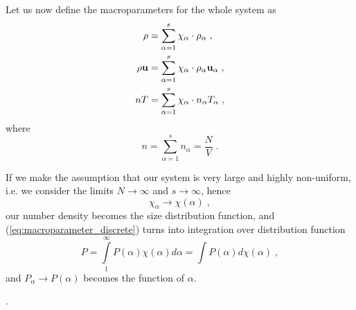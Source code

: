 \documentclass[preprint, aps, pra]{revtex4-1}
\newcommand{\bu}{{\bf{u}}}
\begin{document}
Let us now define the macroparameters for the whole system as
\begin{equation}
  \begin{split}
    \rho &= \sum_{\alpha=1}^{s}\chi_\alpha\cdot\rho_\alpha\;,\\
    \rho\bu &= \sum_{\alpha=1}^{s}\chi_\alpha\cdot\rho_\alpha\bu_\alpha\;,\\
    nT &= \sum_{\alpha=1}^{s}\chi_\alpha\cdot n_\alpha T_\alpha\;,
  \end{split}
\end{equation}
where
\begin{equation}
  n = \sum_{\alpha=1}^{s} n_\alpha = \frac{N}{V}\;.
\end{equation}

If we make the assumption that our system is very large and 
highly non-uniform, i.e. we consider the limits $N\to\infty$ and $s\to\infty$, hence 
\begin{equation}
  \chi_\alpha\rightarrow\chi(\alpha)\;,
\end{equation}
our number density becomes the size distribution function, and (\ref{eq:macroparameter_discrete}) turns into integration over
distribution function
\begin{equation}
  P = \int\limits_1^\infty P(\alpha)\chi(\alpha)d\alpha=\int P(\alpha)d\chi(\alpha)\;,
\end{equation}
and $P_\alpha\rightarrow P(\alpha)$ becomes the function of $\alpha$.


  \cite{Brilliantov:2004book, Bodrova:2014epl_steep_distr, Brilliantov:2007pre_coll_dyn, 
  Brilliantov:2007pre_coll_adh, Schwager:2007gm_coll_dyn, Dilley:1993icarus_energy_loss, 
  Garzo:2012pre_maxwell_gas, DeSoria:2013pre_hydro_gas, Schaefer:1996jphys_force_schemes, 
  Garzo:2007pre_enskog_I, Garzo:2007pre_enskog_II, Garzo:1999pre_gran_mixture, 
  Geminard:2004pre_gran_pressure, Quinn:2010astro_hill_simplectic, Barrat:2002gm_binary_mix, 
  Hoffmann:2013astrolett_vertical_relax, Cuendet:2007jchem_md_simul, Uecker:2009pre_part_energy, 
  Morishima:2006icarus_dense_ring_simul, Ohtsuki:1998icarus_vel_disp, Salo:2010icarus_N_body, 
  Greenberg:1988icarus, Spahn:2006gamm_hydro_rings, Lois:2007pre_shear_flow, 
  Spahn:2004euro_lett_kinetic_fraggr, Spahn:2000icarus_stability_analysis, WisdomTremaine:1988astro}.


  
  
\end{document}
